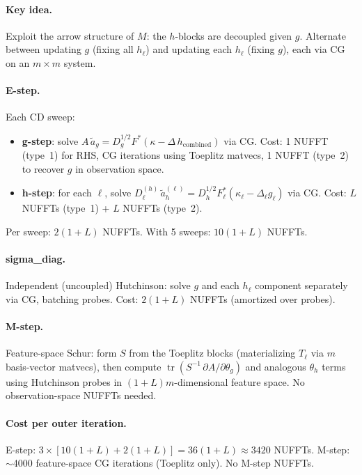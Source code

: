 \documentclass[11pt]{article}
\newcommand{\tr}{\operatorname{tr}}
\begin{document}
\paragraph{Key idea.} Exploit the arrow structure of $M$:
the $h$-blocks are decoupled given $g$. Alternate between
updating $g$ (fixing all $h_\ell$) and updating each $h_\ell$
(fixing $g$), each via CG on an $m{\times}m$ system.

\paragraph{E-step.}
Each CD sweep:
\begin{itemize}
\item \textbf{g-step}: solve $A\,\tilde a_g = D_g^{1/2} F^*
  (\kappa - \Delta\,h_{\text{combined}})$ via CG.
  Cost: 1 NUFFT (type~1) for RHS, CG iterations using Toeplitz
  matvecs, 1 NUFFT (type~2) to recover $g$ in observation space.
\item \textbf{h-step}: for each $\ell$, solve
  $D_\ell^{(h)}\,\tilde a_h^{(\ell)} = D_h^{1/2} F_\ell^*
  (\kappa_\ell - \Delta_\ell g_\ell)$ via CG.
  Cost: $L$ NUFFTs (type~1) + $L$ NUFFTs (type~2).
\end{itemize}
Per sweep: $2(1{+}L)$ NUFFTs. With 5 sweeps: $10(1{+}L)$ NUFFTs.

\paragraph{sigma\_diag.}
Independent (uncoupled) Hutchinson: solve $g$ and each $h_\ell$
component separately via CG, batching probes.
Cost: $2(1{+}L)$ NUFFTs (amortized over probes).

\paragraph{M-step.}
Feature-space Schur: form $S$ from the Toeplitz blocks
(materializing $T_\ell$ via $m$ basis-vector matvecs),
then compute $\tr(S^{-1}\,\partial A/\partial\theta_g)$ and
analogous $\theta_h$ terms using Hutchinson probes in
$(1{+}L)m$-dimensional feature space. No observation-space
NUFFTs needed.

\paragraph{Cost per outer iteration.}
E-step: $3 \times [10(1{+}L) + 2(1{+}L)] = 36(1{+}L) \approx 3420$
NUFFTs. M-step: $\sim$4000 feature-space CG iterations (Toeplitz only).
No M-step NUFFTs.
\end{document}

